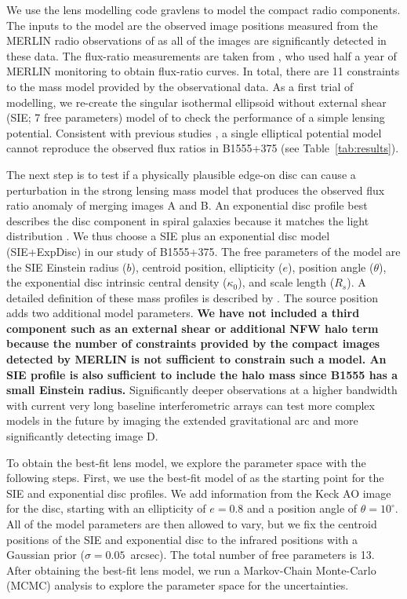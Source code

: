 \documentclass[a4paper,fleqn,usenatbib,useAMS]{mnras}
\begin{document}
We use the lens modelling code {\sc gravlens} \citep{Kee01} to model the compact radio components. The inputs to the model are the observed image positions measured from the MERLIN radio observations of \citet{Marlow99} as all of the images are significantly detected in these data. The flux-ratio measurements are taken from \citet{K03}, who used half a year of MERLIN monitoring to obtain flux-ratio curves. In total, there are 11 constraints to the mass model provided by the observational data. As a first trial of modelling, we re-create the singular isothermal ellipsoid without external shear (SIE; 7 free parameters) model of \citet{Marlow99} to check the performance of a simple lensing potential. Consistent with previous studies \citep{Marlow99,Xu15}, a single elliptical potential model cannot reproduce the observed flux ratios in B1555+375 (see Table~\ref{tab:results}). 

The next step is to test if a physically plausible edge-on disc can cause a perturbation in the strong lensing mass model that produces the observed flux ratio anomaly of  merging images A and B. An exponential disc profile best describes the disc component in spiral galaxies because it matches the light distribution \citep{Kee98}. We thus choose a SIE plus an exponential disc model (SIE+ExpDisc) in our study of B1555+375. The free parameters of the model are the SIE Einstein radius ($b$), centroid position, ellipticity ($e$), position angle ($\theta$), the exponential disc intrinsic central density ($\kappa_0$), and scale length ($R_s$). A detailed definition of these mass profiles is described by \citet{Kee01}. The source position adds two additional model parameters. {\bf We have not included a third component such as an external shear or additional NFW halo term because the number of constraints provided by the compact images detected by MERLIN is not sufficient to constrain such a model. An SIE profile is also sufficient to include the halo mass since B1555 has a small Einstein radius.} Significantly deeper observations at a higher bandwidth with current very long baseline interferometric arrays can test more complex models in the future by imaging the extended gravitational arc and more significantly detecting image D. 

To obtain the best-fit lens model, we explore the parameter space with the following steps. First, we use the best-fit model of \citet{Marlow99} as the starting point for the SIE and exponential disc profiles. We add information from the Keck AO image for the disc, starting with an ellipticity of $e=0.8$ and a position angle of $\theta=10^\circ$.  All of the model parameters are then allowed to vary, but we fix the centroid positions of the SIE and exponential disc to the infrared positions with a Gaussian prior ($\sigma = 0.05 $~arcsec). The total number of free parameters is 13. After obtaining the best-fit lens model, we run a Markov-Chain Monte-Carlo (MCMC) analysis to explore the parameter space for the uncertainties.
\end{document}
